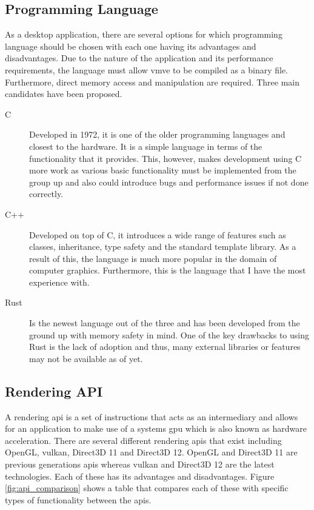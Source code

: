 \documentclass[11pt]{article}
\begin{document}
\subsection{Programming Language} \label{programming_language}
As a desktop application, there are several options for which programming
language should be chosen with each one having its advantages and disadvantages.
Due to the nature of the application and its performance requirements, the
language must allow \gls*{vmve} to be compiled as a binary file. Furthermore,
direct memory access and manipulation are required. Three main candidates have
been proposed.

\begin{description}
  \item[C] Developed in 1972, it is one of the older programming languages and
    closest to the hardware. It is a simple language in terms of the
    functionality that it provides. This, however, makes development using C
    more work as various basic functionality must be implemented from the group
    up and also could introduce bugs and performance issues if not done
    correctly.
  \item[C++] Developed on top of C, it introduces a wide range of features such
    as classes, inheritance, type safety and the standard template library. As a
    result of this, the language is much more popular in the domain of computer
    graphics. Furthermore, this is the language that I have the most experience
    with.
  \item[Rust] Is the newest language out of the three and has been developed
    from the ground up with memory safety in mind. One of the key drawbacks to
    using Rust is the lack of adoption and thus, many external libraries or
    features may not be available as of yet.
\end{description}

\subsection{Rendering API} \label{rendering_api_tech_review} 

A rendering \gls*{api} is a set of instructions that acts as an intermediary and
allows for an application to make use of a systems \gls*{gpu} which is also
known as hardware acceleration. There are several different rendering
\glspl*{api} that exist including OpenGL, \gls*{vulkan}, Direct3D 11 and
Direct3D 12. OpenGL and Direct3D 11 are previous generations \glspl*{api}
whereas \gls*{vulkan} and Direct3D 12 are the latest technologies. Each of these
has its advantages and disadvantages. Figure \ref{fig:api_comparison} shows a
table that compares each of these with specific types of functionality between
the \glspl*{api}.
\end{document}
